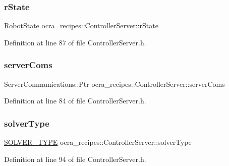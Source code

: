 \subsubsection{\texorpdfstring{r\+State}{rState}}
{\footnotesize\ttfamily \hyperlink{classocra__recipes_1_1RobotState}{Robot\+State} ocra\+\_\+recipes\+::\+Controller\+Server\+::r\+State\hspace{0.3cm}{\ttfamily [protected]}}



Definition at line 87 of file Controller\+Server.\+h.

\hypertarget{classocra__recipes_1_1ControllerServer_af01dc7be410bfebebefedc5f4bb27d1b}{}\label{classocra__recipes_1_1ControllerServer_af01dc7be410bfebebefedc5f4bb27d1b} 
\subsubsection{\texorpdfstring{server\+Coms}{serverComs}}
{\footnotesize\ttfamily Server\+Communications\+::\+Ptr ocra\+\_\+recipes\+::\+Controller\+Server\+::server\+Coms\hspace{0.3cm}{\ttfamily [protected]}}



Definition at line 84 of file Controller\+Server.\+h.

\hypertarget{classocra__recipes_1_1ControllerServer_a7c7d1eda2c96085709f0c3a28fd998a4}{}\label{classocra__recipes_1_1ControllerServer_a7c7d1eda2c96085709f0c3a28fd998a4} 
\subsubsection{\texorpdfstring{solver\+Type}{solverType}}
{\footnotesize\ttfamily \hyperlink{namespaceocra__recipes_afb3bb4de56c2b9472c80d746eb13fed3}{S\+O\+L\+V\+E\+R\+\_\+\+T\+Y\+PE} ocra\+\_\+recipes\+::\+Controller\+Server\+::solver\+Type\hspace{0.3cm}{\ttfamily [protected]}}



Definition at line 94 of file Controller\+Server.\+h.

